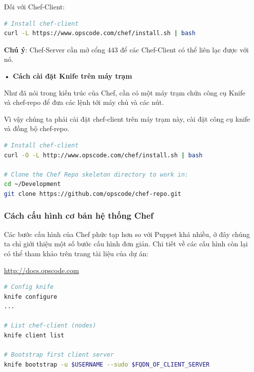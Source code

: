 \newpage
\clearpage

Đối với Chef-Client:

\begin{lstlisting}[label={lst:chef_install_client_ubuntu},caption={Cách cài đặt chef-client trên Ubuntu},language=bash]
# Install chef-client
curl -L https://www.opscode.com/chef/install.sh | bash
\end{lstlisting}

\textbf{Chú ý}: Chef-Server cần mở cổng 443 để các Chef-Client có thể liên lạc được với nó.

\textbf{• Cách cài đặt Knife trên máy trạm}

Như đã nói trong kiến trúc của Chef, cần có một máy trạm chứa công cụ Knife và chef-repo để đưa các lệnh tới máy chủ và các nút.

Vì vậy chúng ta phải cài đặt chef-client trên máy trạm này, cài đặt công cụ knife và đồng bộ chef-repo.

\begin{lstlisting}[label={lst:chef_install_knife},caption={Cách cài đặt knife và chef-repo},language=bash]
# Install chef-client
curl -O -L http://www.opscode.com/chef/install.sh | bash

# Clone the Chef Repo skeleton directory to work in:
cd ~/Development
git clone https://github.com/opscode/chef-repo.git
\end{lstlisting}

\newpage
\clearpage

\subsubsection{Cách cấu hình cơ bản hệ thống Chef}

Các bước cấu hình của Chef phức tạp hơn so với Puppet khá nhiều, ở đây chúng ta chỉ giới thiệu một số bước cấu hình đơn giản. Chi tiết về các cấu hình còn lại có thể tham khảo trên trang tài liệu của dự án:

\url{http://docs.opscode.com}

\begin{lstlisting}[label={lst:chef_basic_config},caption={Các bước cấu hình hệ thống Chef},language=bash]
# Config knife
knife configure
...

# List chef-client (nodes)
knife client list

# Bootstrap first client server
knife bootstrap -u $USERNAME --sudo $FQDN_OF_CLIENT_SERVER
\end{lstlisting}

